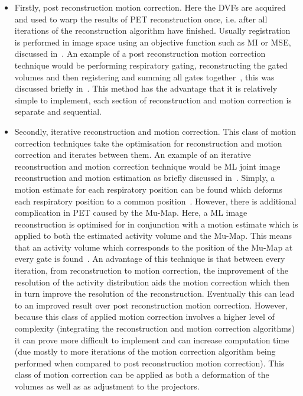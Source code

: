             \begin{itemize}
                \item Firstly, post reconstruction motion correction. Here the \glspl{DVF} are acquired and used to warp the results of \gls{PET} reconstruction once, i.e. after all iterations of the reconstruction algorithm have finished. Usually registration is performed in image space using an objective function such as \gls{MI} or \gls{MSE}, discussed in~. An example of a post reconstruction motion correction technique would be performing respiratory gating, reconstructing the gated volumes and then registering and summing all gates together~\parencite{Polycarpou2012AnalysisImaging}, this was discussed briefly in~. This method has the advantage that it is relatively simple to implement, each section of reconstruction and motion correction is separate and sequential.
                
                \item Secondly, iterative reconstruction and motion correction. This class of motion correction techniques take the optimisation for reconstruction and motion correction and iterates between them. An example of an iterative reconstruction and motion correction technique would be \gls{ML} joint image reconstruction and motion estimation as briefly discussed in~. Simply, a motion estimate for each respiratory position can be found which deforms each respiratory position to a common position~\parencite{Manjeshwar2006, Qiao2006}. However, there is additional complication in \gls{PET} caused by the \gls{Mu-Map}. Here, a \gls{ML} image reconstruction is optimised for in conjunction with a motion estimate which is applied to both the estimated activity volume and the \gls{Mu-Map}. This means that an activity volume which corresponds to the position of the \gls{Mu-Map} at every gate is found~\parencite{Bousse2016a, Bousse2016}. An advantage of this technique is that between every iteration, from reconstruction to motion correction, the improvement of the resolution of the activity distribution aids the motion correction which then in turn improve the resolution of the reconstruction. Eventually this can lead to an improved result over post reconstruction motion correction. However, because this class of applied motion correction involves a higher level of complexity (integrating the reconstruction and motion correction algorithms) it can prove more difficult to implement and can increase computation time (due mostly to more iterations of the motion correction algorithm being performed when compared to post reconstruction motion correction). This class of motion correction can be applied as both a deformation of the volumes as well as as adjustment to the projectors.
                

\end{itemize}

